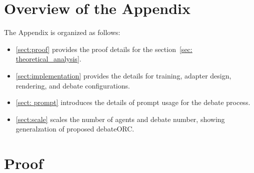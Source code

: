 \documentclass{article}
\theoremstyle{plain}
\theoremstyle{definition}
\theoremstyle{remark}
\begin{document}






\newpage
\appendix
\onecolumn
\section*{Overview of the Appendix}
The Appendix is organized as follows:
\begin{itemize}
    \item \autoref{sect:proof} provides the proof details for the section~\ref{sec: theoretical_analysis}.
    \item \autoref{sect:implementation} provides the details for training, adapter design, rendering, and debate configurations.
    \item \autoref{sect: prompt} introduces the details of prompt usage for the debate process.
    \item \autoref{sect:scale} scales the number of agents and debate number, showing generalzation of proposed debateORC.
\end{itemize}




\section{Proof}
\label{sect:proof}
\end{document}

